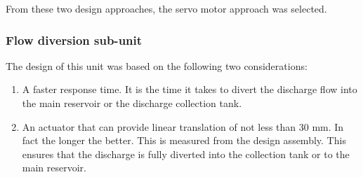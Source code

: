 \begin{enumerate}
\begin{enumerate}
    \end{enumerate}
\end{enumerate}

From these two design approaches, the servo motor approach was selected.

\subsubsection{Flow diversion sub-unit}
The design of this unit was based on the following two considerations:
\begin{enumerate}
    \item A faster response time. It is the time it takes to divert the discharge flow into the main reservoir or the discharge collection tank. 
    \item An actuator that can provide linear translation of not less than 30 mm. In fact the longer the better. This is measured from the design assembly. This ensures that the discharge is fully diverted into the collection tank or to the main reservoir. 
\end{enumerate}

